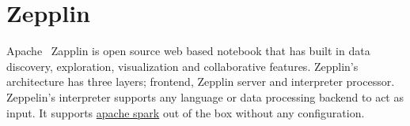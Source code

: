 \section{Zepplin}

Apache~\cite{hid-sp18-413-Zepplin} Zapplin is open source web based notebook
that has built in data discovery, exploration, visualization and collaborative
features. Zepplin’s architecture has three layers; frontend, Zepplin server and
interpreter processor. Zeppelin’s interpreter supports any language or data
processing backend to act as input. It supports
\href{https://en.wikipedia.org/wiki/Apache_Spark}{apache spark} out of the box
without any configuration.
